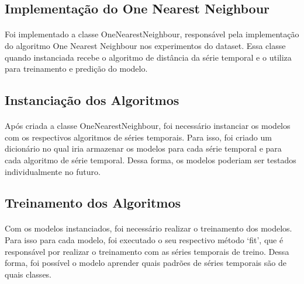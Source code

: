 \documentclass[12pt]{article}
\begin{document}


\subsection{Implementação do One Nearest Neighbour}

\paragraph{}Foi implementado a classe OneNearestNeighbour, responsável pela implementação do algoritmo One Nearest Neighbour nos experimentos do dataset. Essa classe quando instanciada recebe o algoritmo de distância da série temporal e o utiliza para treinamento e predição do modelo.



\subsection{Instanciação dos Algoritmos}

\paragraph{}Após criada a classe OneNearestNeighbour, foi necessário instanciar os modelos com os respectivos algoritmos de séries temporais. Para isso, foi criado um dicionário no qual iria armazenar os modelos para cada série temporal e para cada algoritmo de série temporal. Dessa forma, os modelos poderiam ser testados individualmente no futuro.

\subsection{Treinamento dos Algoritmos}

\paragraph{}Com os modelos instanciados, foi necessário realizar o treinamento dos modelos. Para isso para cada modelo, foi executado o seu respectivo método ‘fit’, que é responsável por realizar o treinamento com as séries temporais de treino. Dessa forma, foi possível o modelo aprender quais padrões de séries temporais são de quais classes.
\end{document}
